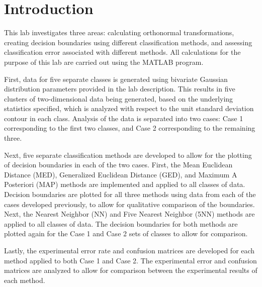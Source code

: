 \section{Introduction}
This lab investigates three areas: calculating orthonormal transformations, creating decision boundaries using different classification methods, and assessing classification error associated with different methods. All calculations for the purpose of this lab are carried out using the MATLAB program.

First, data for five separate classes is generated using bivariate Gaussian distribution parameters provided in the lab description. This results in five clusters of two-dimensional data being generated, based on the underlying statistics specified, which is analyzed with respect to the unit standard deviation contour in each class. Analysis of the data is separated into two cases: Case 1 corresponding to the first two classes, and Case 2 corresponding to the remaining three.

Next, five separate classification methods are developed to allow for the plotting of decision boundaries in each of the two cases. First, the Mean Euclidean Distance (MED), Generalized Euclidean Distance (GED), and Maximum A Posteriori (MAP) methods are implemented and applied to all classes of data. Decision boundaries are plotted for all three methods using data from each of the cases developed previously, to allow for qualitative comparison of the boundaries. Next, the Nearest Neighbor (NN) and Five Nearest Neighbor (5NN) methods are applied to all classes of data. The decision boundaries for both methods are plotted again for the Case 1 and Case 2 sets of classes to allow for comparison.

Lastly, the experimental error rate and confusion matrices are developed for each method applied to both Case 1 and Case 2. The experimental error and confusion matrices are analyzed to allow for comparison between the experimental results of each method. 
